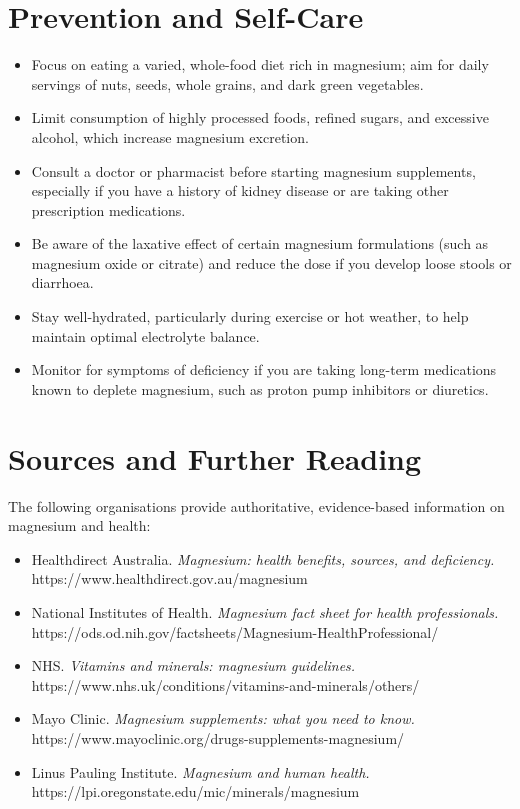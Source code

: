 \section*{Prevention and Self-Care}
\begin{itemize}
    \item Focus on eating a varied, whole-food diet rich in magnesium; aim for daily servings of nuts, seeds, whole grains, and dark green vegetables.
    \item Limit consumption of highly processed foods, refined sugars, and excessive alcohol, which increase magnesium excretion.
    \item Consult a doctor or pharmacist before starting magnesium supplements, especially if you have a history of kidney disease or are taking other prescription medications.
    \item Be aware of the laxative effect of certain magnesium formulations (such as magnesium oxide or citrate) and reduce the dose if you develop loose stools or diarrhoea.
    \item Stay well-hydrated, particularly during exercise or hot weather, to help maintain optimal electrolyte balance.
    \item Monitor for symptoms of deficiency if you are taking long-term medications known to deplete magnesium, such as proton pump inhibitors or diuretics.
\end{itemize}

\section*{Sources and Further Reading}
The following organisations provide authoritative, evidence-based information on magnesium and health:
\begin{itemize}
    \item Healthdirect Australia. \textit{Magnesium: health benefits, sources, and deficiency.} https://www.healthdirect.gov.au/magnesium
    \item National Institutes of Health. \textit{Magnesium fact sheet for health professionals.} https://ods.od.nih.gov/factsheets/Magnesium-HealthProfessional/
    \item NHS. \textit{Vitamins and minerals: magnesium guidelines.} https://www.nhs.uk/conditions/vitamins-and-minerals/others/
    \item Mayo Clinic. \textit{Magnesium supplements: what you need to know.} https://www.mayoclinic.org/drugs-supplements-magnesium/
    \item Linus Pauling Institute. \textit{Magnesium and human health.} https://lpi.oregonstate.edu/mic/minerals/magnesium
\end{itemize}
